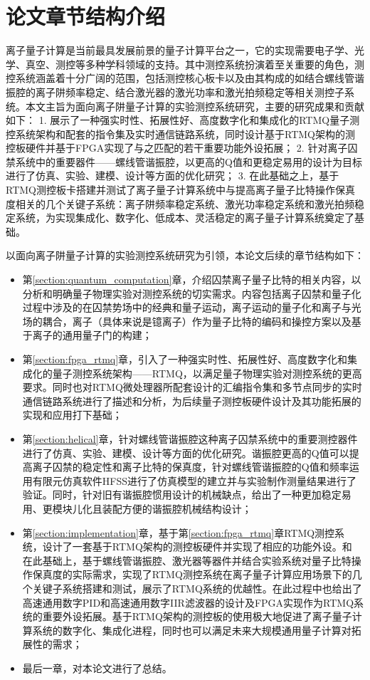 \section[论文章节结构介绍]{论文章节结构介绍}
离子量子计算是当前最具发展前景的量子计算平台之一，它的实现需要电子学、光学、真空、测控等多种学科领域的支持。其中测控系统扮演着至关重要的角色，测控系统涵盖着十分广阔的范围，包括测控核心板卡以及由其构成的如结合螺线管谐振腔的离子阱频率稳定、结合激光器的激光功率和激光拍频稳定等相关测控子系统。本文主旨为面向离子阱量子计算的实验测控系统研究，主要的研究成果和贡献如下：
1. 展示了一种强实时性、拓展性好、高度数字化和集成化的RTMQ量子测控系统架构和配套的指令集及实时通信链路系统，同时设计基于RTMQ架构的测控板硬件并基于FPGA实现了与之匹配的若干重要功能外设拓展；
2. 针对离子囚禁系统中的重要器件——螺线管谐振腔，以更高的Q值和更稳定易用的设计为目标进行了仿真、实验、建模、设计等方面的优化研究；
3. 在此基础之上，基于RTMQ测控板卡搭建并测试了离子量子计算系统中与提高离子量子比特操作保真度相关的几个关键子系统：离子阱频率稳定系统、激光功率稳定系统和激光拍频稳定系统，为实现集成化、数字化、低成本、灵活稳定的离子量子计算系统奠定了基础。

以面向离子阱量子计算的实验测控系统研究为引领，本论文后续的章节结构如下：
\begin{itemize}
    \item 第\ref{section:quantum_computation}章，介绍囚禁离子量子比特的相关内容，以分析和明确量子物理实验对测控系统的切实需求。内容包括离子囚禁和量子化过程中涉及的在囚禁势场中的经典和量子运动，离子运动的量子化和离子与光场的耦合，离子（具体来说是镱离子）作为量子比特的编码和操控方案以及基于离子的通用量子门的构建；
    \item 第\ref{section:fpga_rtmq}章，引入了一种强实时性、拓展性好、高度数字化和集成化的量子测控系统架构——RTMQ，以满足量子物理实验对测控系统的更高要求。同时也对RTMQ微处理器所配套设计的汇编指令集和多节点同步的实时通信链路系统进行了描述和分析，为后续量子测控板硬件设计及其功能拓展的实现和应用打下基础；
    \item 第\ref{section:helical}章，针对螺线管谐振腔这种离子囚禁系统中的重要测控器件进行了仿真、实验、建模、设计等方面的优化研究。谐振腔更高的Q值可以提高离子囚禁的稳定性和离子比特的保真度，针对螺线管谐振腔的Q值和频率运用有限元仿真软件HFSS进行了仿真模型的建立并与实验制作测量结果进行了验证。同时，针对旧有谐振腔惯用设计的机械缺点，给出了一种更加稳定易用、更模块儿化且装配方便的谐振腔机械结构设计；
    \item 第\ref{section:implementation}章，基于第\ref{section:fpga_rtmq}章RTMQ测控系统，设计了一套基于RTMQ架构的测控板硬件并实现了相应的功能外设。和
    在此基础上，基于螺线管谐振腔、激光器等器件并结合实验系统对量子比特操作保真度的实际需求，实现了RTMQ测控系统在离子量子计算应用场景下的几个关键子系统搭建和测试，展示了RTMQ系统的优越性。在此过程中也给出了高速通用数字PID和高速通用数字IIR滤波器的设计及FPGA实现作为RTMQ系统的重要外设拓展。基于RTMQ架构的测控板的使用极大地促进了离子量子计算系统的数字化、集成化进程，同时也可以满足未来大规模通用量子计算对拓展性的需求；
    \item 最后一章，对本论文进行了总结。
\end{itemize}